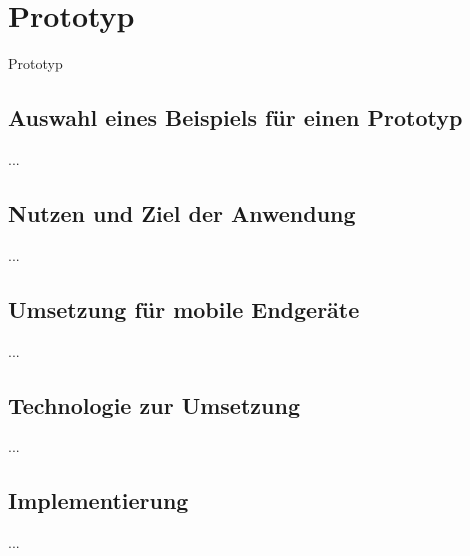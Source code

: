 \section{Prototyp}
Prototyp
	\subsection{Auswahl eines Beispiels für einen Prototyp}
...
	\subsection{Nutzen und Ziel der Anwendung}
...
	\subsection{Umsetzung für mobile Endgeräte}
...
	\subsection{Technologie zur Umsetzung}
...
	\subsection{Implementierung}
...